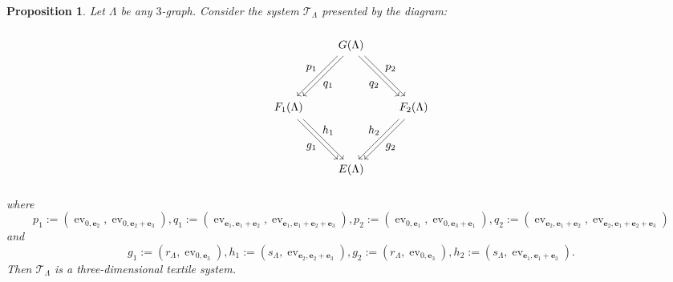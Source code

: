 \documentclass[a4paper,reqno,12pt]{amsart}
\newcommand{\ea}{\mathbf{e}_1}
\newcommand{\eb}{\mathbf{e}_2}
\newcommand{\ec}{\mathbf{e}_3}
\newtheorem{prop}[thm]{Proposition}
\theoremstyle{definition}
\theoremstyle{remark}
\newcommand{\ev}{\operatorname{ev}}
\begin{document}
\begin{prop}\label{pro 3-graph to 3D textile}
Let $\Lambda$ be any $3$-graph. Consider the system $\mathcal{T}_\Lambda$ presented by the diagram:

\[
\begin{tikzpicture}[scale=1.3]
\node[inner sep=0.5pt, circle] (B) at (-1.5,0) {$F_1(\Lambda)$};
\node[inner sep=0.5pt, circle] (C) at (1.5,0) {$F_2(\Lambda)$};	
\node[inner sep=0.5pt, circle] (D) at (0,-1.5) {$E(\Lambda)$};
\node[inner sep=0.5pt, circle] (A) at (0,1.5) {$G(\Lambda)$}; 

\draw[transform canvas={xshift=0.6ex}, ->] (A) -- (B);
\draw[transform canvas={xshift=-0.6ex}, ->] (A) -- (B);

\draw[transform canvas={xshift=0.6ex}, ->] (A) -- (C);
\draw[transform canvas={xshift=-0.6ex}, ->] (A) -- (C);

\draw[transform canvas={xshift=0.6ex}, ->] (C) -- (D);
\draw[transform canvas={xshift=-0.6ex}, ->] (C) -- (D);

\draw[transform canvas={xshift=0.6ex}, ->] (B) -- (D);
\draw[transform canvas={xshift=-0.6ex}, ->] (B) -- (D);

\node at (-0.55,0.55) {$q_1$};
\node at (-0.95,0.95) {$p_1$};

\node at (0.55,0.55) {$q_2$};
\node at (0.95,0.95) {$p_2$};

\node at (-0.55,-0.55) {$h_1$};
\node at (-0.95,-0.95) {$g_1$};

\node at (0.55,-0.55) {$h_2$};
\node at (0.95,-0.95) {$g_2$};
\end{tikzpicture}
\]
where \[p_1:=(\ev_{0,\eb},\ev_{0,\eb+\ec}), q_1:=(\ev_{\ea,\ea+\eb},\ev_{\ea,\ea+\eb+\ec}),p_2:=(\ev_{0,\ea},\ev_{0,\ec+\ea}),q_2:=(\ev_{\eb,\ea+\eb},\ev_{\eb,\ea+\eb+\ec})\] and \[g_1:=(r_\Lambda,\ev_{0,\ec}),h_1:=(s_\Lambda,\ev_{\eb,\eb+\ec}),g_2:=(r_\Lambda,\ev_{0,\ec}),h_2:=(s_\Lambda,\ev_{\ea,\ea+\ec}).\] Then $\mathcal{T}_\Lambda$ is a three-dimensional textile system. 
\end{prop}
\end{document}
